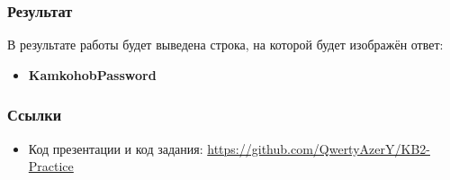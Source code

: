 \documentclass[t]{beamer}
\begin{document}
\begin{frame}[c]
	\begin{block}{}
    \frametitle{Результат}
		 {В результате работы будет выведена строка, на которой будет изображён ответ:}
	\end{block}
    \begin{itemize}
		\item \textbf{KamkohobPassword}
	\end{itemize}
\end{frame}

\begin{frame}[c]
    \frametitle{Ссылки}
	\begin{itemize}
		\item Код презентации и код задания: \href{https://github.com/QwertyAzerY/KB2-Practice}{https://github.com/QwertyAzerY/KB2-Practice}
	\end{itemize}	
\end{frame}
\end{document}
